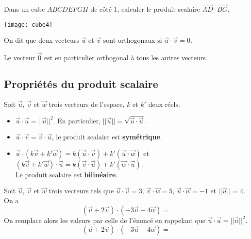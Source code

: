 \documentclass[11pt,fleqn, openany]{book} %
\begin{document}
\begin{example} Dans un cube $ABCDEFGH$ de côté 1, calculer le produit scalaire $\overrightarrow{AD} \cdot \overrightarrow{BG}$.


\texttt{[image: cube4]}


\end{example}

\begin{definition}On dit que deux vecteurs $\vec u$ et $\vec v$ sont orthogonaux si $\vec u \cdot \vec v=0$.
\end{definition}

Le vecteur $\vec 0$ est en particulier orthogonal à tous les autres vecteurs.

\newpage
\subsection{Propriétés du produit scalaire}

\begin{proposition}Soit $\vec u$, $\vec v$ et $\vec w$ trois vecteurs de l'espace, $k$ et $k'$ deux réels.
\begin{itemize}
\item $\vec u \cdot \vec u = \lvert\lvert \vec u\rvert\rvert^2$. En particulier, $\lvert\lvert\vec u\rvert\rvert=\sqrt{\vec u \cdot \vec u}$.
\item $\vec u \cdot \vec v = \vec v \cdot \vec u$, le produit scalaire est \textbf{symétrique}.
\item $\vec u \cdot ( k \vec v + k' \vec w)= k (\vec u \cdot \vec v) + k' (\vec u \cdot \vec w)$ et $( k \vec v + k' \vec w)\cdot \vec u= k (\vec v \cdot \vec u) + k' (\vec w \cdot \vec u)$. \\Le produit scalaire est \textbf{bilinéaire}.
\end{itemize}\end{proposition}

\begin{example} Soit $\vec u$, $\vec v$ et $\vec w$ trois vecteurs tels que $\vec u \cdot \vec v = 3$, $\vec v \cdot \vec w=5$, $\vec u \cdot \vec w = -1$ et $\lvert\lvert\vec u\rvert\rvert=4$. On a
\[ (\vec u + 2\vec v) \cdot (-3\vec u + 4 \vec w)=\]
On remplace alors les valeurs par celle de l'énoncé en rappelant que $\vec u \cdot \vec u = \lvert\lvert\vec u\rvert\rvert^2$.
\[ (\vec u + 2\vec v) \cdot (-3\vec u + 4 \vec w)=\]\vspace{-0.5cm}\end{example}
\end{document}
